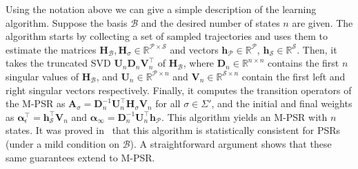 \documentclass[letterpaper]{article}
\newcommand{\mat}[1]{\mathbf{#1}}
\newcommand{\A}{\mat{A}}
\renewcommand{\H}{\mat{H}}
\newcommand{\Rset}{\mathbb{R}}
\newcommand{\R}{\Rset}
\newcommand{\aone}{\boldsymbol{\alpha}_\epsilon}
\newcommand{\ainf}{\boldsymbol{\alpha}_{\infty}}
\newcommand{\Bs}{\mathcal{B}}
\newcommand{\Ps}{\mathcal{P}}
\newcommand{\Ss}{\mathcal{S}}
\begin{document}
Using the notation above we can give a simple description of the learning algorithm. Suppose the basis $\Bs$ and the desired number of states $n$ are given. The algorithm starts by collecting a set of sampled trajectories and uses them to estimate the matrices $\H_{\Bs}, \H_\sigma \in \R^{\Ps \times \Ss}$ and vectors $\mat{h}_{\Ps} \in \R^{\Ps}$, $\mat{h}_{\Ss} \in \R^{\Ss}$. Then, it takes the truncated SVD $\mat{U}_n \mat{D}_n \mat{V}_n^\top$ of $\H_{\Bs}$, where $\mat{D}_n \in \R^{n \times n}$ contains the first $n$ singular values of $\H_{\Bs}$, and $\mat{U}_n \in \R^{\Ps \times n}$ and $\mat{V}_n \in \R^{\Ss \times n}$ contain the first left and right singular vectors respectively. Finally, it computes the transition operators of the M-PSR as $\A_\sigma = \mat{D}_n^{-1} \mat{U}_n^\top \H_\sigma \mat{V}_n$ for all $\sigma \in \Sigma'$, and the initial and final weights as $\aone^\top = \mat{h}_{\Ss}^\top \mat{V}_n$ and $\ainf = \mat{D}_n^{-1} \mat{U}_n^\top \mat{h}_{\Ps}$.
%
This algorithm yields an M-PSR with $n$ states. It was proved in~\cite{bootspsr} that this algorithm is statistically consistent for PSRs (under a mild condition on $\Bs$). A straightforward argument shows that these same guarantees extend to M-PSR.
\end{document}
